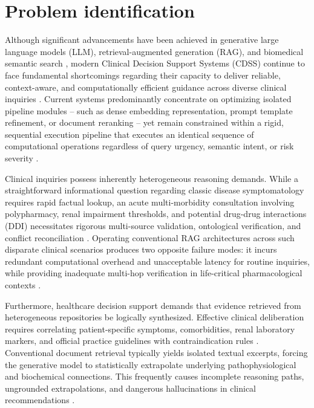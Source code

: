 \documentclass[conference]{IEEEtran}
\begin{document}
\newpage



\twocolumn

\section{Problem identification}

Although significant advancements have been achieved in generative large language models (LLM), retrieval-augmented generation (RAG), and biomedical semantic search \cite{THIRUNAVUKARASU2023,ZAKKA2024,WANG2025100504}, modern Clinical Decision Support Systems (CDSS) continue to face fundamental shortcomings regarding their capacity to deliver reliable, context-aware, and computationally efficient guidance across diverse clinical inquiries \cite{info17020133,ai6100240,BAO2024102768}. Current systems predominantly concentrate on optimizing isolated pipeline modules -- such as dense embedding representation, prompt template refinement, or document reranking -- yet remain constrained within a rigid, sequential execution pipeline that executes an identical sequence of computational operations regardless of query urgency, semantic intent, or risk severity \cite{WANG2025100504,LAWANNA2026100926}.

Clinical inquiries possess inherently heterogeneous reasoning demands. While a straightforward informational question regarding classic disease symptomatology requires rapid factual lookup, an acute multi-morbidity consultation involving polypharmacy, renal impairment thresholds, and potential drug-drug interactions (DDI) necessitates rigorous multi-source validation, ontological verification, and conflict reconciliation \cite{ai6100240,info17020133,ALKHALAF2024104662}. Operating conventional RAG architectures across such disparate clinical scenarios produces two opposite failure modes: it incurs redundant computational overhead and unacceptable latency for routine inquiries, while providing inadequate multi-hop verification in life-critical pharmacological contexts \cite{WANG2025100504,LAWANNA2026100926}.

Furthermore, healthcare decision support demands that evidence retrieved from heterogeneous repositories be logically synthesized. Effective clinical deliberation requires correlating patient-specific symptoms, comorbidities, renal laboratory markers, and official practice guidelines with contraindication rules \cite{GARCIACARMONA2025,BAO2024102768}. Conventional document retrieval typically yields isolated textual excerpts, forcing the generative model to statistically extrapolate underlying pathophysiological and biochemical connections. This frequently causes incomplete reasoning paths, ungrounded extrapolations, and dangerous hallucinations in clinical recommendations \cite{ZAKKA2024,info17020133}.
\end{document}
